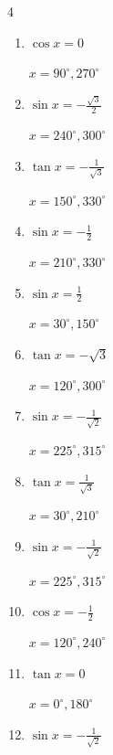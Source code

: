 \begin{multicols}{4}
\begin{enumerate}
  \item $\displaystyle \cos{x}  = 0$

        $\displaystyle x = 90^{\circ} , 270^{\circ}$

  \item $\displaystyle \sin{x}  = -\frac{\sqrt{3}}{2}$

        $\displaystyle x = 240^{\circ} , 300^{\circ}$

  \item $\displaystyle \tan{x}  = -\frac{1}{\sqrt{3}}$

        $\displaystyle x = 150^{\circ} , 330^{\circ}$

  \item $\displaystyle \sin{x}  = -\frac{1}{2}$

        $\displaystyle x = 210^{\circ} , 330^{\circ}$

  \item $\displaystyle \sin{x}  = \frac{1}{2}$

        $\displaystyle x = 30^{\circ} , 150^{\circ}$

  \item $\displaystyle \tan{x}  = -\sqrt{3}$

        $\displaystyle x = 120^{\circ} , 300^{\circ}$

  \item $\displaystyle \sin{x}  = -\frac{1}{\sqrt{2}}$

        $\displaystyle x = 225^{\circ} , 315^{\circ}$

  \item $\displaystyle \tan{x}  = \frac{1}{\sqrt{3}}$

        $\displaystyle x = 30^{\circ} , 210^{\circ}$

  \item $\displaystyle \sin{x}  = -\frac{1}{\sqrt{2}}$

        $\displaystyle x = 225^{\circ} , 315^{\circ}$

  \item $\displaystyle \cos{x}  = -\frac{1}{2}$

        $\displaystyle x = 120^{\circ} , 240^{\circ}$

  \item $\displaystyle \tan{x}  = 0$

        $\displaystyle x = 0^{\circ} , 180^{\circ}$

  \item $\displaystyle \sin{x}  = -\frac{1}{\sqrt{2}}$


\end{enumerate}
\end{multicols}
